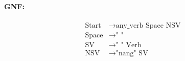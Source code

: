 \paragraph{GNF:}

\begin{equation*}
    \begin{aligned}
        \text{Start} &\rightarrow \text{any\_verb Space NSV} \\
        \text{Space} &\rightarrow \text{" "} \\
        \text{SV} &\rightarrow \text{" " Verb} \\
        \text{NSV} &\rightarrow \text{"nang" SV}
    \end{aligned}
\end{equation*}